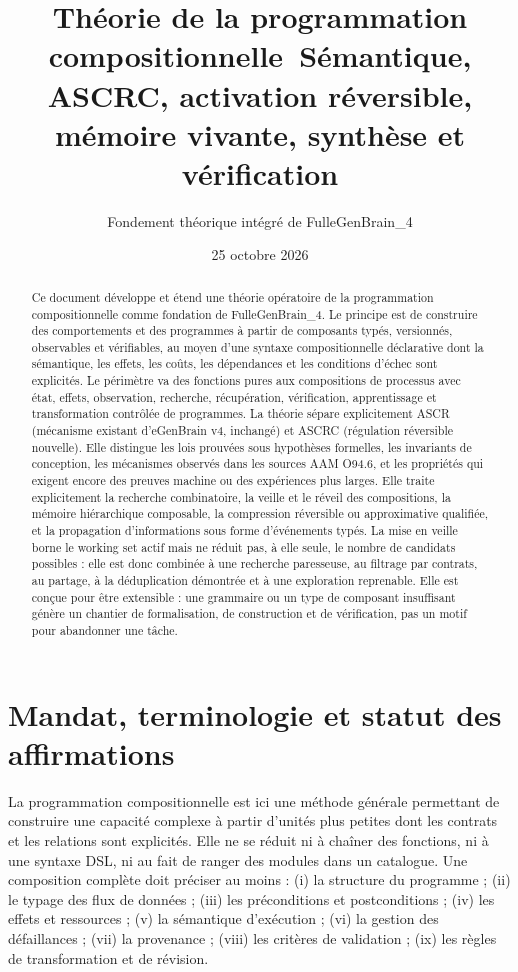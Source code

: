 \documentclass[11pt,a4paper]{article}
\title{Théorie de la programmation compositionnelle\
\large Sémantique, ASCRC, activation réversible, mémoire vivante, synthèse et vérification}
\author{Fondement théorique intégré de FulleGenBrain\_4}
\date{25 octobre 2026}
\theoremstyle{definition}
\theoremstyle{plain}
\theoremstyle{remark}
\begin{document}
\maketitle
\begin{abstract}
Ce document développe et étend une théorie opératoire de la programmation compositionnelle comme fondation de FulleGenBrain\_4. Le principe est de construire des comportements et des programmes à partir de composants typés, versionnés, observables et vérifiables, au moyen d'une syntaxe compositionnelle déclarative dont la sémantique, les effets, les coûts, les dépendances et les conditions d'échec sont explicités. Le périmètre va des fonctions pures aux compositions de processus avec état, effets, observation, recherche, récupération, vérification, apprentissage et transformation contrôlée de programmes. La théorie sépare explicitement ASCR (mécanisme existant d’eGenBrain v4, inchangé) et ASCRC (régulation réversible nouvelle). Elle distingue les lois prouvées sous hypothèses formelles, les invariants de conception, les mécanismes observés dans les sources AAM O94.6, et les propriétés qui exigent encore des preuves machine ou des expériences plus larges. Elle traite explicitement la recherche combinatoire, la veille et le réveil des compositions, la mémoire hiérarchique composable, la compression réversible ou approximative qualifiée, et la propagation d'informations sous forme d'événements typés. La mise en veille borne le working set actif mais ne réduit pas, à elle seule, le nombre de candidats possibles : elle est donc combinée à une recherche paresseuse, au filtrage par contrats, au partage, à la déduplication démontrée et à une exploration reprenable. Elle est conçue pour être extensible : une grammaire ou un type de composant insuffisant génère un chantier de formalisation, de construction et de vérification, pas un motif pour abandonner une tâche.
\end{abstract}
\newpage\setcounter{tocdepth}{1}\tableofcontents\newpage

\section{Mandat, terminologie et statut des affirmations}
La programmation compositionnelle est ici une méthode générale permettant de construire une capacité complexe à partir d'unités plus petites dont les contrats et les relations sont explicités. Elle ne se réduit ni à chaîner des fonctions, ni à une syntaxe DSL, ni au fait de ranger des modules dans un catalogue. Une composition complète doit préciser au moins : (i) la structure du programme ; (ii) le typage des flux de données ; (iii) les préconditions et postconditions ; (iv) les effets et ressources ; (v) la sémantique d'exécution ; (vi) la gestion des défaillances ; (vii) la provenance ; (viii) les critères de validation ; (ix) les règles de transformation et de révision.
\end{document}
